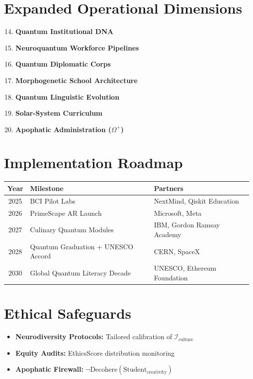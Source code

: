 \documentclass[11pt]{article}
\theoremstyle{plain}
\theoremstyle{definition}
\begin{document}
\section{Expanded Operational Dimensions}
\begin{enumerate}
    \setcounter{enumi}{13}
    \item \textbf{Quantum Institutional DNA}
    \item \textbf{Neuroquantum Workforce Pipelines}
    \item \textbf{Quantum Diplomatic Corps}
    \item \textbf{Morphogenetic School Architecture}
    \item \textbf{Quantum Linguistic Evolution}
    \item \textbf{Solar-System Curriculum}
    \item \textbf{Apophatic Administration (\(\Omega^+\))}
\end{enumerate}

\section{Implementation Roadmap}
\begin{center}
\begin{tabular}{|c|l|l|}
\hline
\textbf{Year} & \textbf{Milestone} & \textbf{Partners} \\
\hline
2025 & BCI Pilot Labs & NextMind, Qiskit Education \\
2026 & PrimeScape AR Launch & Microsoft, Meta \\
2027 & Culinary Quantum Modules & IBM, Gordon Ramsay Academy \\
2028 & Quantum Graduation + UNESCO Accord & CERN, SpaceX \\
2030 & Global Quantum Literacy Decade & UNESCO, Ethereum Foundation \\
\hline
\end{tabular}
\end{center}

\section{Ethical Safeguards}
\begin{itemize}
    \item \textbf{Neurodiversity Protocols:} Tailored calibration of \(\mathcal{I}_{\text{culture}}\)
    \item \textbf{Equity Audits:} EthicsScore distribution monitoring
    \item \textbf{Apophatic Firewall:} \(\neg \text{Decohere}(\text{Student}_{\text{creativity}})\)
\end{itemize}
\end{document}
